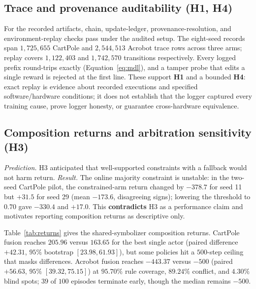 \documentclass[11pt]{article}
\begin{document}
\subsection{Trace and provenance auditability (H1, H4)}
For the recorded artifacts, chain, update-ledger, provenance-resolution, and environment-replay
checks pass under the audited setup. The eight-seed records span $1{,}725{,}655$ CartPole and
$2{,}544{,}513$ Acrobot trace rows across three arms; replay covers $1{,}122{,}403$ and
$1{,}742{,}570$ transitions respectively. Every logged prefix round-trips exactly
(Equation~\eqref{eq:mdl}), and a tamper probe that edits a single reward is rejected at the first
line. These support \textbf{H1} and a bounded \textbf{H4}: exact replay is evidence about recorded
executions and specified software/hardware conditions; it does not establish that the logger
captured every training cause, prove logger honesty, or guarantee cross-hardware equivalence.

\subsection{Composition returns and arbitration sensitivity (H3)}
\label{sec:arbitration}
\emph{Prediction.} H3 anticipated that well-supported constraints with a fallback would not harm
return. \emph{Result.} The online majority constraint is unstable: in the two-seed CartPole pilot,
the constrained-arm return changed by $-378.7$ for seed 11 but $+31.5$ for seed 29 (mean
$-173.6$, disagreeing signs); lowering the threshold to $0.70$ gave $-330.4$ and $+17.0$. This
\textbf{contradicts} H3 as a performance claim and motivates reporting composition returns as
descriptive only.

Table~\ref{tab:returns} gives the shared-symbolizer composition returns. CartPole fusion reaches
$205.96$ versus $163.65$ for the best single actor (paired difference $+42.31$, $95\%$ bootstrap
$[23.98,61.93]$), but some policies hit a $500$-step ceiling that masks differences. Acrobot
fusion reaches $-443.37$ versus $-500$ (paired $+56.63$, $95\%$ $[39.32,75.15]$) at $95.70\%$
rule coverage, $89.24\%$ conflict, and $4.30\%$ blind spots; $39$ of $100$ episodes terminate
early, though the median remains $-500$.
\end{document}
